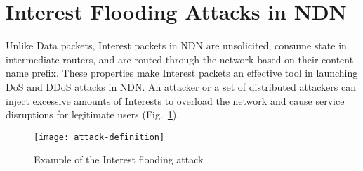 \section{Interest Flooding Attacks in NDN}
\label{sec:interest-flooding}




Unlike Data packets, Interest packets in NDN are unsolicited, consume state in intermediate routers, and are routed through the network based on their content name prefix. These properties make Interest packets an effective tool in launching DoS and DDoS attacks in NDN. An attacker or a set of distributed attackers can inject excessive amounts of Interests to overload the network and cause service disruptions for legitimate users (Fig.~\ref{fig:flooding example}). 

\begin{figure}[htbp]
  \centering
  \texttt{[image: attack-definition]}
  \caption{Example of the Interest flooding attack}
  \label{fig:flooding example}
\end{figure}


